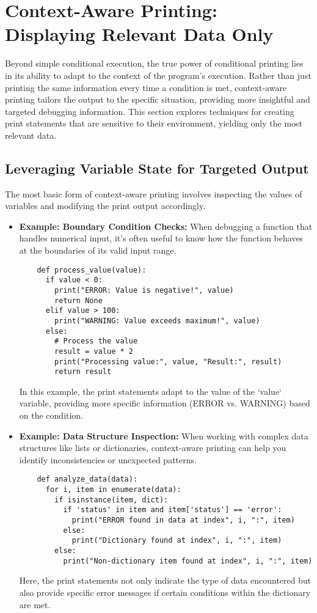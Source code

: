 \documentclass{article}
\begin{document}
{{{\section*{Context-Aware Printing: Displaying Relevant Data Only}

Beyond simple conditional execution, the true power of conditional printing lies in its ability to adapt to the context of the program's execution. Rather than just printing the same information every time a condition is met, context-aware printing tailors the output to the specific situation, providing more insightful and targeted debugging information. This section explores techniques for creating print statements that are sensitive to their environment, yielding only the most relevant data.

\subsection*{Leveraging Variable State for Targeted Output}

The most basic form of context-aware printing involves inspecting the values of variables and modifying the print output accordingly.

\begin{itemize}
    \item \textbf{Example: Boundary Condition Checks:} When debugging a function that handles numerical input, it's often useful to know how the function behaves at the boundaries of its valid input range.
    \begin{verbatim}
    def process_value(value):
      if value < 0:
        print("ERROR: Value is negative!", value)
        return None
      elif value > 100:
        print("WARNING: Value exceeds maximum!", value)
      else:
        # Process the value
        result = value * 2
        print("Processing value:", value, "Result:", result)
        return result
    \end{verbatim}
    In this example, the print statements adapt to the value of the `value` variable, providing more specific information (ERROR vs. WARNING) based on the condition.
    \item \textbf{Example: Data Structure Inspection:} When working with complex data structures like lists or dictionaries, context-aware printing can help you identify inconsistencies or unexpected patterns.
    \begin{verbatim}
    def analyze_data(data):
      for i, item in enumerate(data):
        if isinstance(item, dict):
          if 'status' in item and item['status'] == 'error':
            print("ERROR found in data at index", i, ":", item)
          else:
            print("Dictionary found at index", i, ":", item)
        else:
          print("Non-dictionary item found at index", i, ":", item)
    \end{verbatim}
    Here, the print statements not only indicate the type of data encountered but also provide specific error messages if certain conditions within the dictionary are met.
\end{itemize}

}}}
\end{document}
